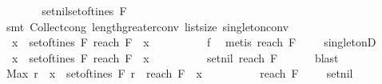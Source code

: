 \begin{isabellebody}
\ \ \ \ \isamarkupfalse%
\ \isamarkupfalse%
\ set{\isacharunderscore}nil{\isacharcolon}{\isachardoublequoteopen}set{\isacharunderscore}of{\isacharunderscore}tines\ F\ {\isacharequal}\ {\isacharbraceleft}{\isacharbrackleft}{\isacharbrackright}{\isacharbraceright}{\isachardoublequoteclose}\isanewline
\ \ \ \ \ \ \isamarkupfalse%
\ {\isacharparenleft}smt\ Collect{\isacharunderscore}cong\ length{\isacharunderscore}greater{\isacharunderscore}{}{\isacharunderscore}conv\ list{\isachardot}size{\isacharparenleft}{}{\isacharparenright}\ singleton{\isacharunderscore}conv{\isacharparenright}\isanewline
\ \ \ \ \isamarkupfalse%
\ \isamarkupfalse%
\ {\isachardoublequoteopen}{\isacharparenleft}{\isasymforall}\ x\ {\isasymin}\ set{\isacharunderscore}of{\isacharunderscore}tines\ F{\isachardot}\ reach\ F\ {\isacharbrackleft}{\isacharbrackright}\ x\ {\isacharequal}\ {}{\isacharparenright}{\isachardoublequoteclose}\isanewline
\ \ \ \ \ \ \isamarkupfalse%
\ f{}\ \isamarkupfalse%
\ {\isacharparenleft}metis\ {\isacartoucheopen}reach\ F\ {\isacharbrackleft}{\isacharbrackright}\ {\isacharbrackleft}{\isacharbrackright}\ {\isacharequal}\ {}{\isacartoucheclose}\ singletonD{\isacharparenright}\isanewline
\ \ \ \ \isamarkupfalse%
\ {\isachardoublequoteopen}{\isacharparenleft}{\isasymexists}\ x\ {\isasymin}\ set{\isacharunderscore}of{\isacharunderscore}tines\ F{\isachardot}\ reach\ F\ {\isacharbrackleft}{\isacharbrackright}\ x\ {\isacharequal}\ {}{\isacharparenright}{\isachardoublequoteclose}\isanewline
\ \ \ \ \ \ \isamarkupfalse%
\ set{\isacharunderscore}nil\ {\isacartoucheopen}reach\ F\ {\isacharbrackleft}{\isacharbrackright}\ {\isacharbrackleft}{\isacharbrackright}\ {\isacharequal}\ {}{\isacartoucheclose}\ \isamarkupfalse%
\ blast\isanewline
\ \ \ \ \isamarkupfalse%
\ {\isachardoublequoteopen}Max\ {\isacharbraceleft}r{\isachardot}\ {\isasymexists}\ x\ {\isasymin}\ set{\isacharunderscore}of{\isacharunderscore}tines\ F{\isachardot}\ r\ {\isacharequal}\ reach\ F\ {\isacharbrackleft}{\isacharbrackright}\ x{\isacharbraceright}\ {\isacharequal}\ {}{\isachardoublequoteclose}\isanewline
\ \ \ \ \ \ \isamarkupfalse%
\ {\isacartoucheopen}reach\ F\ {\isacharbrackleft}{\isacharbrackright}\ {\isacharbrackleft}{\isacharbrackright}\ {\isacharequal}\ {}{\isacartoucheclose}\ set{\isacharunderscore}nil\ \isamarkupfalse%

\end{isabellebody}
